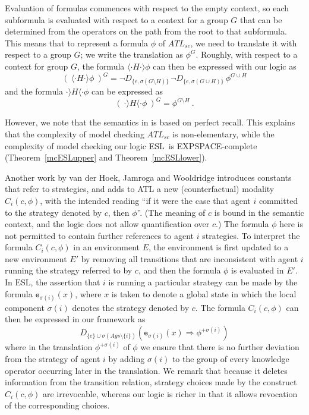 \documentclass[a4wide]{article}
\newcommand{\ESL}{\mbox{ESL}}
\theoremstyle{examplesty}
\newcommand{\strat}{\sigma}
\newcommand{\Ags}{\mathit{Ags}}
\newcommand{\lid}[2]{\mathtt{e}_{#1}(#2)}
\newcommand{\rimp}{\Rightarrow}
\begin{document}
Evaluation of formulas commences with respect to the empty context, so each subformula 
is evaluated with respect to a context  for a group $G$ that can be determined from the 
operators on the path from the root to that subformula. 
This means that to represent a formula $\phi$ of $ATL_{sc}$, we need to translate it with respect to 
a group $G$; we write the translation as $\phi^G$. 
Roughly, with respect to a context for group $G$, 
the formula $\langle\cdot H \cdot\rangle\phi$ can then be expressed with our logic as 
 $$ 
(~\langle\cdot H \cdot\rangle\phi ~)^{G} = 
  \neg D_{\{e,\strat(G\setminus H)\}}\, \neg 
D_{\{e,\strat(G\cup H)\} } \, 
\phi^{G\cup H}
 $$ 
and  the formula $\cdot\rangle H \langle\cdot\phi$ can be expressed as 
 $$  (~ \cdot\rangle H \langle\cdot\phi ~ )^G = 
\phi^{G\setminus H}~.
 $$
 
 
However, we note that the semantics in \cite{BCLM2009} is based on perfect recall. This explains that the complexity of model checking $ATL_{sc}$ is non-elementary, while the complexity of model checking our logic \ESL\ is EXPSPACE-complete (Theorem~\ref{mcESLupper} and Theorem~\ref{mcESLlower}).  


Another work by van der Hoek, Jamroga and Wooldridge 
\cite{CATL} introduces constants that refer to strategies, and adds to ATL a new 
 (counterfactual) modality $C_i(c,\phi)$, with the intended reading ``if it were the case that agent $i$ committed to the strategy denoted by 
 $c$, then $\phi$''. 
(The meaning of $c$ is bound in the semantic context, and the logic does not allow quantification over $c$.)
 The formula $\phi$ here is not permitted to contain further references to agent $i$ strategies. 
 To interpret the formula $C_i(c,\phi)$ in an environment  $E$, the environment is first updated to a new environment $E'$ by removing all transitions that
 are inconsistent with agent $i$ running the strategy referred to by $c$, and then the formula $\phi$ is evaluated in $E'$. 
In $\ESL$, the assertion that $i$ is running a particular strategy can be made by the formula 
$\lid{\strat(i)}{x}$, 
where $x$ is taken to denote a 
global state in which the local component $\strat(i)$ denotes the strategy denoted by $c$. 
The formula $C_i(c,\phi)$ can then be expressed in our framework as 
$$D_{\{e\} \cup \sigma(\Ags \setminus \{i\})}( 
\lid{\strat(i)}{x}
\rimp  \phi^{+\strat(i)})$$ 
where in the translation $\phi^{+\strat(i)}$ of  $\phi$  we ensure that there is no further deviation from the strategy of agent $i$ 
by adding $\sigma(i)$ to the group of every  knowledge operator occurring later in the translation. 
We remark that because it deletes information from the transition relation, strategy choices made by the construct  $C_i(c,\phi)$ 
are irrevocable, whereas our logic is richer in that it allows revocation of the corresponding choices. 
\end{document}
